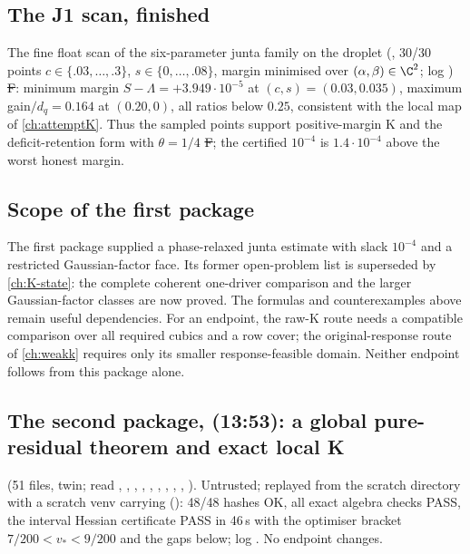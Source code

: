 \subsection{The J1 scan, finished}\label{sec:kjoint-j1}
The fine float scan of the six-parameter junta family on the droplet (, 30/30 points $c\in\{.03,\ldots,.3\}$, $s\in\{0,\ldots,.08\}$, margin minimised over
$(\alpha,\beta)\in\C^2$; log ) \st{F}: minimum margin $S-\Lambda=+3.949\cdot10^{-5}$ at $(c,s)=(0.03,0.035)$, maximum
gain$/d_q=0.164$ at $(0.20,0)$, all ratios below $0.25$, consistent with the local map of \autoref{ch:attemptK}. Thus the sampled points support positive-margin K and the deficit-retention form with $\theta=1/4$ \st{F}; the certified $10^{-4}$ is $1.4\cdot10^{-4}$ above the worst honest margin.

\subsection{Scope of the first package}\label{sec:kjoint-remains}
The first package supplied a phase-relaxed junta estimate with slack
$10^{-4}$ and a restricted Gaussian-factor face. Its former open-problem
list is superseded by \autoref{ch:K-state}: the complete coherent
one-driver comparison and the larger Gaussian-factor classes are now
proved. The formulas and counterexamples above remain useful dependencies.
For an endpoint, the raw-K route needs a compatible comparison over all
required cubics and a row cover; the original-response route of
\autoref{ch:weakk} requires only its smaller response-feasible domain.
Neither endpoint follows from this package alone.

\subsection{The second package,  (13:53): a global pure-residual theorem and exact local K}\label{sec:kfull}
 (51 files,  twin; read , , ,
, , , ,
, , ). Untrusted; replayed from the
scratch directory with a scratch venv carrying  (): 48/48 hashes OK, all exact algebra checks PASS, the interval Hessian certificate PASS in 46\,s with the
optimiser bracket $7/200<v_*<9/200$ and the gaps below; log . No endpoint changes.

